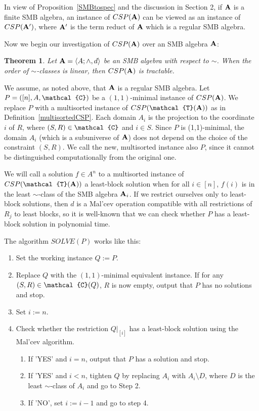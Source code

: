\documentclass[11pt]{amsart}
\newcommand{\m}[1]{{\uppercase {\mathbf {#1}}}}
\newcommand{\vr}[1]{{\uppercase {\mathcal{#1}}}}
\newcommand{\lb}{\langle}
\newcommand{\rb}{\rangle}
\newcommand{\mt}{\wedge}
\newtheorem{thm}{Theorem}[section]
\theoremstyle{definition}
\begin{document}
In view of Proposition~\ref{SMBtospec} and the discussion in Section 2, if $\m a$ is a finite SMB algebra, an instance of $CSP(\m a)$ can be viewed as an instance of $CSP(\m a')$, where $\m a'$ is the term reduct of $\m a$ which is a regular SMB algebra.

Now we begin our investigation of $CSP(\m a)$ over an SMB algebra $\m a$:

\begin{thm}\label{lintract}
Let $\m a=\lb A;\mt,d\rb$ be an SMB algebra with respect to $\sim$. When the order of $\sim$-classes is linear, then $CSP(\m a)$ is tractable.
\end{thm}

\proof
We assume, as noted above, that $\m a$ is a regular SMB algebra. Let $P=([n],A,\vr c)$ be a $(1,1)$-minimal instance of $CSP(\m a)$. We replace $P$ with a multisorted instance of $CSP(\vr t(\m a))$ as in Definition~\ref{multisortedCSP}. Each domain $A_i$ is the projection to the coordinate $i$ of $R$, where $(S,R)\in \vr c$ and $i\in S$. Since $P$ is (1,1)-minimal, the domain $A_i$ (which is a subuniverse of $\m a$) does not depend on the choice of the constraint $(S,R)$. We call the new, multisorted instance also $P$, since it cannot be distinguished computationally from the original one.

We will call a solution $f\in A^n$ to a multisorted instance of $CSP(\vr t(\m a))$ a least-block solution when for all $i\in [n]$, $f(i)$ is in the least $\sim$-class of the SMB algebra $\m a_i$. If we restrict ourselves only to least-block solutions, then $d$ is a Mal'cev operation compatible with all restrictions of $R_j$ to least blocks, so it is well-known that we can check whether $P$ has a least-block solution in polynomial time. 

The algorithm $SOLVE(P)$ works like this:

\begin{enumerate}
\item[{\bf Step 1.}] Set the working instance $Q:=P$.
\item[{\bf Step 2.}] Replace $Q$ with the $(1,1)$-minimal equivalent instance. If for any $(S,R)\in\vr c(Q)$, $R$ is now empty, output that $P$ has no solutions and stop.
\item[{\bf Step 3.}] Set $i:=n$.
\item[{\bf Step 4.}] Check whether the restriction $Q|_{[i]}$ has a least-block solution using the Mal'cev algorithm.
\begin{enumerate}
\item[{\bf Step 4.a}] If 'YES' and $i=n$, output that $P$ has a solution and stop.
\item[{\bf Step 4.b}] If 'YES' and $i<n$, tighten $Q$ by replacing $A_i$ with $A_i\setminus D$, where $D$ is the least $\sim$-class of $A_{i}$ and go to Step 2.
\item[{\bf Step 4.c}] If 'NO', set $i:=i-1$ and go to step 4.
\end{enumerate}
\end{enumerate}
\end{document}
